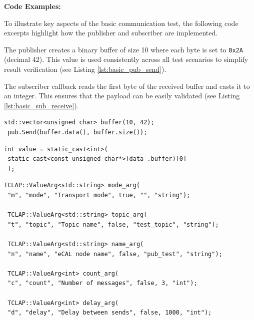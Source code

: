 \textbf{Code Examples:}

\vspace{0.4em}
To illustrate key aspects of the basic communication test, the following code excerpts highlight how the publisher and subscriber are implemented.

\vspace{1em}
The publisher creates a binary buffer of size 10 where each byte is set to \texttt{0x2A} (decimal 42). This value is used consistently across all test scenarios to simplify result verification (see Listing \ref{lst:basic_pub_send}).

\vspace{1em}
The subscriber callback reads the first byte of the received buffer and casts it to an integer. This ensures that the payload can be easily validated (see Listing \ref{lst:basic_sub_receive}).
\vspace{0.5em}

\begin{lstlisting}[style=cppstyle, caption={Binary buffer with value 42 used by the publisher}, label={lst:basic_pub_send}, captionpos=b]
 std::vector<unsigned char> buffer(10, 42);
 pub.Send(buffer.data(), buffer.size());
\end{lstlisting}

\begin{lstlisting}[style=cppstyle, caption={Extracting first byte from the received message in subscriber}, label={lst:basic_sub_receive}, captionpos=b]
 int value = static_cast<int>(
 static_cast<const unsigned char*>(data_.buffer)[0]
 );
\end{lstlisting}

\begin{lstlisting}[style=cppstyle, caption={Argument setup using TCLAP in both publisher and subscriber}, label={lst:tclap_basic}, captionpos=b]
 TCLAP::ValueArg<std::string> mode_arg(
 "m", "mode", "Transport mode", true, "", "string");
 
 TCLAP::ValueArg<std::string> topic_arg(
 "t", "topic", "Topic name", false, "test_topic", "string");
 
 TCLAP::ValueArg<std::string> name_arg(
 "n", "name", "eCAL node name", false, "pub_test", "string");
 
 TCLAP::ValueArg<int> count_arg(
 "c", "count", "Number of messages", false, 3, "int");
 
 TCLAP::ValueArg<int> delay_arg(
 "d", "delay", "Delay between sends", false, 1000, "int");
\end{lstlisting}

